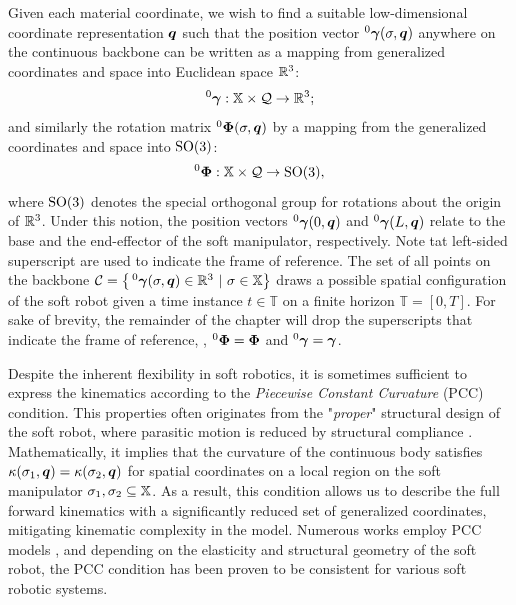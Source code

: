 Given each material coordinate, we wish to find a suitable low-dimensional  coordinate representation ${\boldsymbol{q}}$ such that the position vector $^0{\boldsymbol{\gamma}}(\sigma,{\boldsymbol{q}})$ anywhere on the continuous backbone can be written as a mapping from generalized coordinates and space into Euclidean space $\mathbb{R}^3$:
%
\begin{equation}
^0{\boldsymbol{\gamma}}: \mathbb{X} \times \mathcal{Q} \to \mathbb{R}^3;
\end{equation}
%
and similarly the rotation matrix $^0\boldsymbol{\Phi}(\sigma,\boldsymbol{q})$ by a mapping from the generalized coordinates and space into $\textup{\textrm{SO}}(3)$:
%
\begin{equation}
^0{\boldsymbol{\Phi}}: \mathbb{X} \times \mathcal{Q} \to \textup{\textrm{SO}}(3), \label{eq:phi_map}
\end{equation}
%
where {$\textup{\textrm{SO}}(3)$ denotes the special orthogonal group for rotations about the origin of $\mathbb{R}^3$}. Under this notion, the position vectors $^0{\boldsymbol{\gamma}}(0,{\boldsymbol{q}})$ and $^0{\boldsymbol{\gamma}}(L,{\boldsymbol{q}})$ relate to the base and the end-effector of the soft  manipulator, respectively. {Note tat left-sided superscript are used to indicate the frame of reference.} The set of all points on the backbone ${\mathcal{C}} = \left\{\,^0{\boldsymbol{\gamma}}(\sigma,{\boldsymbol{q}}) \in \mathbb{R}^3~|~\sigma \in \mathbb{X} \right\}$ draws a possible {spatial} configuration of the soft robot given {a time instance $t \in \mathbb{T}$ on a finite horizon $\mathbb{T} = [0,T]$}.  For sake of brevity, the remainder of the chapter will drop the superscripts that indicate the frame of reference, \ie, $^0{\boldsymbol{\Phi}} = {\boldsymbol{\Phi}}$ and $^0{\boldsymbol{\gamma}} = {\boldsymbol{\gamma}}$.
%
\begin{asm}
\label{asm:C2:pcc}
Despite the inherent flexibility in soft robotics, it is sometimes sufficient to express the kinematics according to the \emph{Piecewise Constant Curvature} (PCC) condition.  This properties often originates from the "\textit{proper}" structural design of the soft robot, where parasitic motion is reduced by structural compliance . Mathematically, it implies that the curvature of the continuous body satisfies $\kappa(\sigma_1,{\boldsymbol{q}}) = \kappa(\sigma_2,{\boldsymbol{q}})$ for spatial coordinates on a local region on the soft manipulator $\sigma_1,\sigma_2 \subseteq \mathbb{X}$. As a result, this condition allows us to describe the full forward kinematics with a significantly reduced set of generalized coordinates, mitigating kinematic complexity in the model. Numerous works employ PCC models \cite{Falkenhahn2015,Katzschmann2019,Tatlicioglu2007,Marchese2016,Godage2016,DellaSantina2020a}, and depending on the elasticity  and structural geometry of the soft robot, the PCC condition has been proven to be consistent for various soft robotic systems.
\end{asm}
